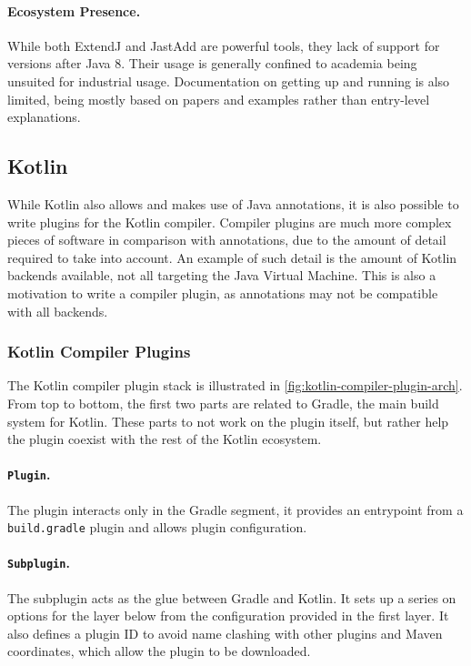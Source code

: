 \paragraph{Ecosystem Presence.}
While both ExtendJ and JastAdd are powerful tools, they lack of support for versions after Java 8.
Their usage is generally confined to academia being unsuited for industrial usage.
Documentation on getting up and running is also limited,
being mostly based on papers and examples rather than entry-level explanations.



\subsection{Kotlin}\label{sec:lang-preprocessors:kotlin}

While Kotlin also allows and makes use of Java annotations, it is also possible to write plugins for the Kotlin compiler.
Compiler plugins are much more complex pieces of software in comparison with annotations,
due to the amount of detail required to take into account.
An example of such detail is the amount of Kotlin backends available, not all targeting the Java Virtual Machine.
This is also a motivation to write a compiler plugin, as annotations may not be compatible with all backends.

\subsubsection*{Kotlin Compiler Plugins}\label{sec:lang-preprocessors:kotlin:annotation}
The Kotlin compiler plugin stack is illustrated in \autoref{fig:kotlin-compiler-plugin-arch}.
From top to bottom, the first two parts are related to Gradle, the main build system for Kotlin.
These parts to not work on the plugin itself, but rather help the plugin coexist with the rest of the Kotlin ecosystem.

\paragraph{\texttt{Plugin}.}
The plugin interacts only in the Gradle segment,
it provides an entrypoint from a \texttt{build.gradle} plugin and allows plugin configuration.

\paragraph{\texttt{Subplugin}.}
The subplugin acts as the glue between Gradle and Kotlin.
It sets up a series on options for the layer below from the configuration provided in the first layer.
It also defines a plugin ID to avoid name clashing with other plugins and Maven coordinates, which allow the plugin to be downloaded.


